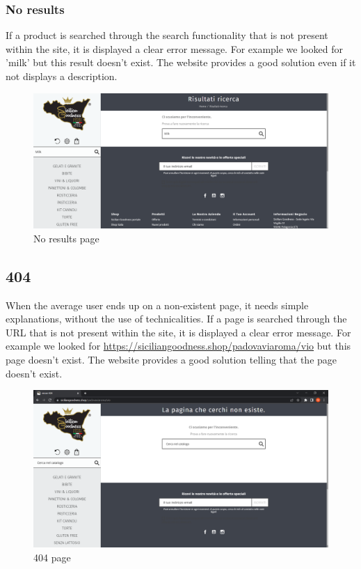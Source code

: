 \subsubsection{No results}
If a product is searched through the search functionality that is not present within the site, it is displayed a clear error message.
For example we looked for 'milk' but this result doesn't exist. The website provides a good solution even if it not displays a description.

\begin{figure}[H]
	\centering\includegraphics[width=12cm]{Img/noresult.png}
	\caption{No results page}
\end{figure}

\subsection{404}
When the average user ends up on a non-existent page, it needs simple explanations, without the use of technicalities.
If a page is searched through the URL that is not present within the site, it is displayed a clear error message.
For example we looked for \url{https://siciliangoodness.shop/padovaviaroma/vio} but this page doesn't exist. The website provides a good solution telling that the page doesn't exist.

\begin{figure}[H]
	\centering\includegraphics[width=12cm]{Img/404.png}
	\caption{404 page}
\end{figure}

